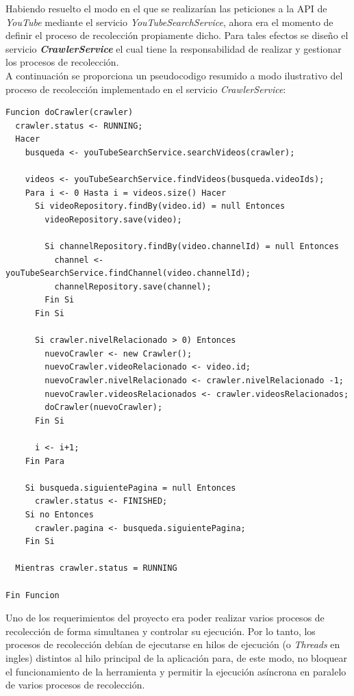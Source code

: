 \documentclass[11pt,a4paper]{article}
\begin{document}
Habiendo resuelto el modo en el que se realizarían las peticiones a la API de \textit{YouTube} mediante el servicio \textit{YouTubeSearchService}, ahora era el momento de definir el proceso de recolección propiamente dicho. Para tales efectos se diseño el servicio \textit{\textbf{CrawlerService}} el cual tiene la responsabilidad de realizar y gestionar los procesos de recolección.
\\

A continuación se proporciona un pseudocodigo resumido a modo ilustrativo del proceso de recolección implementado en el servicio \textit{CrawlerService}:
\begin{lstlisting}[style=C]
Funcion doCrawler(crawler)
  crawler.status <- RUNNING;
  Hacer
    busqueda <- youTubeSearchService.searchVideos(crawler);
    
    videos <- youTubeSearchService.findVideos(busqueda.videoIds);
    Para i <- 0 Hasta i = videos.size() Hacer
      Si videoRepository.findBy(video.id) = null Entonces
        videoRepository.save(video);
        
        Si channelRepository.findBy(video.channelId) = null Entonces
          channel <- youTubeSearchService.findChannel(video.channelId);
          channelRepository.save(channel);
        Fin Si
      Fin Si
      
      Si crawler.nivelRelacionado > 0) Entonces
        nuevoCrawler <- new Crawler();
        nuevoCrawler.videoRelacionado <- video.id;
        nuevoCrawler.nivelRelacionado <- crawler.nivelRelacionado -1;
        nuevoCrawler.videosRelacionados <- crawler.videosRelacionados;
        doCrawler(nuevoCrawler);
      Fin Si
      
      i <- i+1;
    Fin Para
    
    Si busqueda.siguientePagina = null Entonces
      crawler.status <- FINISHED;
    Si no Entonces
      crawler.pagina <- busqueda.siguientePagina;
    Fin Si
    
  Mientras crawler.status = RUNNING
  
Fin Funcion
\end{lstlisting}	


Uno de los requerimientos del proyecto era poder realizar varios procesos de recolección de forma simultanea y controlar su ejecución. Por lo tanto, los procesos de recolección debían de ejecutarse en hilos de ejecución (o \textit{Threads} en ingles) distintos al hilo principal de la aplicación para, de este modo, no bloquear el funcionamiento de la herramienta y permitir la ejecución asíncrona en paralelo de varios procesos de recolección.
\\
\end{document}
